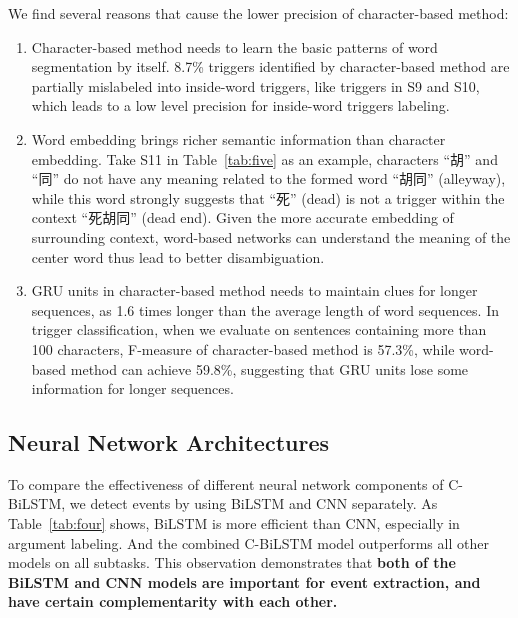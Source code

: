 We find several reasons that cause the lower precision of character-based method:

\begin{enumerate}
	\item Character-based method needs to learn the basic patterns of word segmentation by itself. 8.7\% triggers identified by character-based method are partially mislabeled into inside-word triggers, like triggers in S9 and S10,  which leads to a low level precision for inside-word triggers labeling.
	\item Word embedding brings richer semantic information than character embedding. Take S11 in Table~\ref{tab:five} as an example, characters ``胡'' and ``同'' do not have any meaning related to the formed word ``胡同'' (alleyway), while this word strongly suggests that ``死'' (dead) is not a trigger within the context ``死胡同'' (dead end). Given the more accurate embedding of surrounding context, word-based networks can understand the meaning of the center word thus lead to better disambiguation.
	\item GRU units in character-based method needs to maintain clues for longer sequences, as 1.6 times longer than the average length of word sequences. In trigger classification, when we evaluate on sentences containing more than 100 characters, F-measure of character-based method is 57.3\%, while word-based method can achieve 59.8\%, suggesting that GRU units lose some information for longer sequences.
\end{enumerate}

\subsection{Neural Network Architectures}
To compare the effectiveness of different neural network components of C-BiLSTM, we detect events by using BiLSTM and CNN separately. As Table~\ref{tab:four} shows, BiLSTM is more efficient than CNN, especially in argument labeling. And the combined C-BiLSTM model outperforms all other models on all subtasks. This observation demonstrates that \textbf{both of the BiLSTM and CNN models are important for event extraction, and have certain complementarity with each other.}

